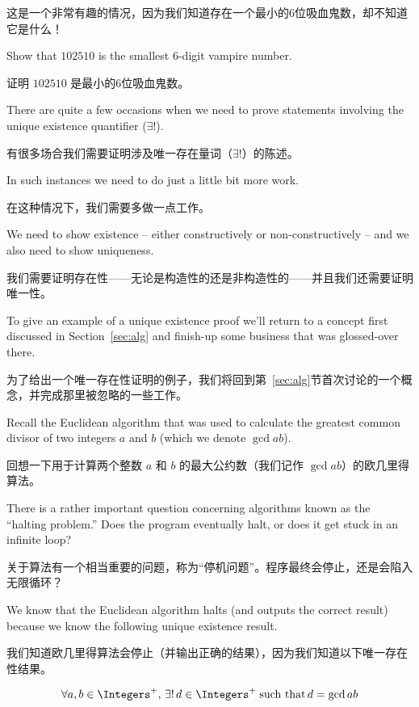 这是一个非常有趣的情况，因为我们知道存在一个最小的6位吸血鬼数，却不知道它是什么！

\begin{exer}
      Show that $102510$ is the smallest 6-digit vampire number.

      证明 $102510$ 是最小的6位吸血鬼数。
\end{exer}

There are quite a few occasions when we need to prove statements
involving the  unique existence quantifier
($\exists !$).

有很多场合我们需要证明涉及唯一存在量词（$\exists !$）的陈述。

In
such instances we need to do just a little bit more work.

在这种情况下，我们需要多做一点工作。

We
need to show existence -- either constructively or non-constructively --
and we also need to show uniqueness.

我们需要证明存在性——无论是构造性的还是非构造性的——并且我们还需要证明唯一性。

To give an example of
a unique existence proof we'll return to a concept first
discussed in Section~\ref{sec:alg} and finish-up some business
that was glossed-over there.

为了给出一个唯一存在性证明的例子，我们将回到第~\ref{sec:alg}节首次讨论的一个概念，并完成那里被忽略的一些工作。

Recall the Euclidean algorithm that was used to calculate the
greatest
common divisor of two integers $a$ and $b$ (which we denote $\gcd{a}{b}$).

回想一下用于计算两个整数 $a$ 和 $b$ 的最大公约数（我们记作 $\gcd{a}{b}$）的欧几里得算法。

There is a rather important question concerning algorithms known as
the ``halting problem.''  Does the program eventually halt, or does it get
stuck in an infinite loop?

关于算法有一个相当重要的问题，称为“停机问题”。程序最终会停止，还是会陷入无限循环？

We know that the Euclidean algorithm halts
(and outputs the correct result) because we know the following
unique existence result.

我们知道欧几里得算法会停止（并输出正确的结果），因为我们知道以下唯一存在性结果。

\[ \forall a, b \in \Integers^+, \, \exists ! \, d \in \Integers^+ \; \mbox{such that} \, d=\gcd{a}{b} \]

